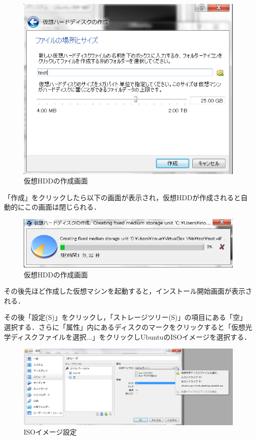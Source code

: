 \begin{figure}[htb]
\centering
\includegraphics[width=15cm]{vb4.png}
\caption{仮想HDDの作成画面}\label{仮想マシンの設定画面}
\end{figure}
\clearpage
「作成」をクリックしたら以下の画面が表示され，仮想HDDが作成されると自動的にこの画面は閉じられる．


\begin{figure}[htb]
\centering
\includegraphics[width=15cm]{vb5.png}
\caption{仮想HDDの作成画面}\label{仮想マシンの設定画面}
\end{figure}

\clearpage


その後先ほど作成した仮想マシンを起動すると，インストール開始画面が表示される．

その後「設定(S)」をクリックし，「ストレージツリー(S)」の項目にある「空」選択する．さらに「属性」内にあるディスクのマークをクリックすると「仮想光学ディスクファイルを選択...」をクリックしUbuntuのISOイメージを選択する．

\begin{figure}[htb]
\centering
\includegraphics[width=15cm]{vb6.png}
\caption{ISOイメージ設定}\label{仮想マシンの設定画面}
\end{figure}


